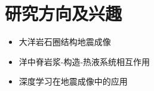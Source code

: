 \section{研究方向及兴趣}

\begin{itemize}
\item 大洋岩石圈结构地震成像
\item 洋中脊岩浆-构造-热液系统相互作用
\item 深度学习在地震成像中的应用
\end{itemize}
